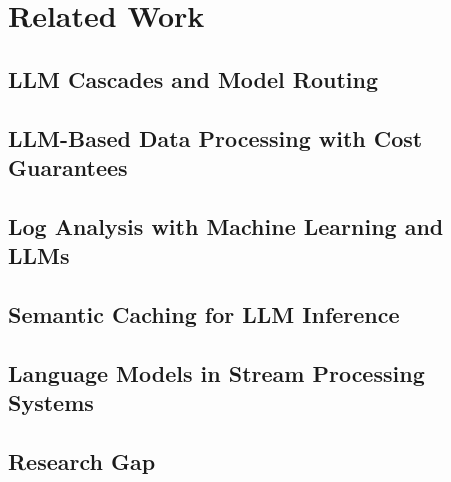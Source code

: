 \chapter{Related Work}\label{ch:related}

\section{LLM Cascades and Model Routing}
\section{LLM-Based Data Processing with Cost Guarantees}
\section{Log Analysis with Machine Learning and LLMs}
\section{Semantic Caching for LLM Inference}
\section{Language Models in Stream Processing Systems}
\section{Research Gap}

